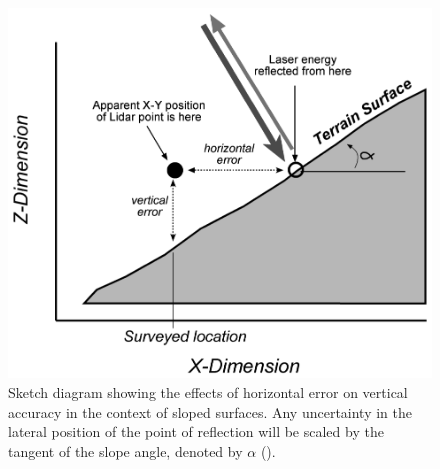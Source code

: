 \begin{figure}
    \includegraphics[width=0.95\linewidth]{p2/figs/hodgson_breshanan_2004_01.png} 
    \caption{Sketch diagram showing the effects of horizontal error on vertical accuracy in the context of sloped surfaces. Any uncertainty in the lateral position of the point of reflection will be scaled by the tangent of the slope angle, denoted by $\alpha$ (\cite{hodgson_breshanan_2004}).}
    \label{fig:elevationaccuracy}
\end{figure}

